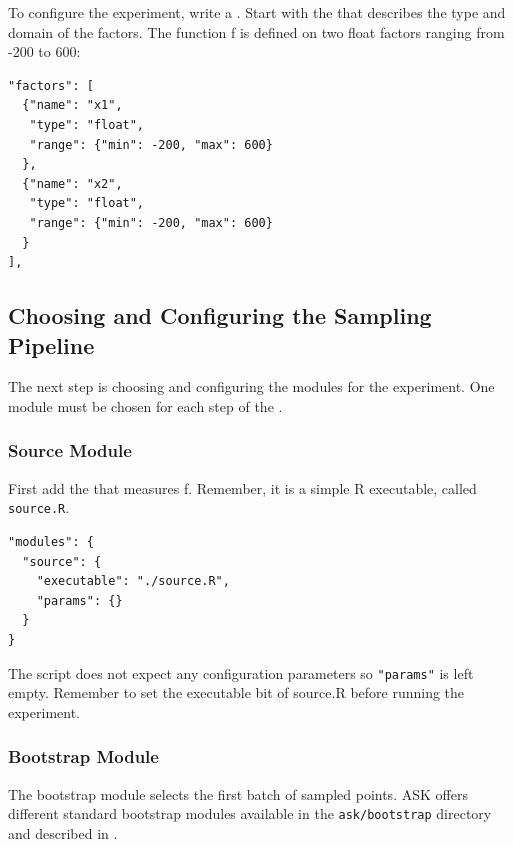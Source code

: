 To configure the experiment, write a .
Start with the  that describes the type and domain of the factors. The function f is defined on two float factors ranging from -200 to 600:

\begin{verbatim}
"factors": [
  {"name": "x1",
   "type": "float",
   "range": {"min": -200, "max": 600}
  },
  {"name": "x2",
   "type": "float",
   "range": {"min": -200, "max": 600}
  }
],
\end{verbatim}

\subsection{Choosing and Configuring the Sampling Pipeline}

The next step is choosing and configuring the modules for the experiment.
One module must be chosen for each step of the .

\subsubsection{Source Module}

First add the  that measures f. Remember, it is a simple R executable, called \texttt{source.R}.
\begin{verbatim}
"modules": {
  "source": {
    "executable": "./source.R",
    "params": {}    
  }
}
\end{verbatim}

The script does not expect any configuration parameters so \texttt{"params"} is left empty.
Remember to set the executable bit of source.R before running the experiment.

\subsubsection{Bootstrap Module}

The bootstrap module selects the first batch of sampled points. ASK offers different standard bootstrap modules available in the \texttt{ask/bootstrap} directory and described in .

